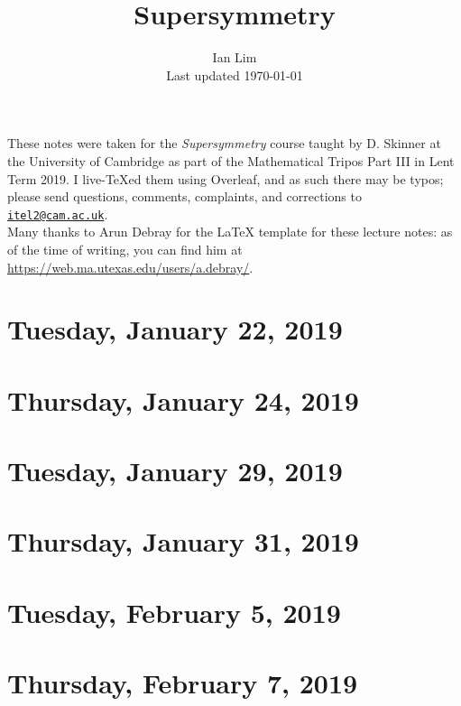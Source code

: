 \documentclass[reqno]{amsart}
\begin{document}
\title{Supersymmetry}
\author{Ian Lim\\ Last updated \today}
\maketitle
{\small\noindent These notes were taken for the \textit{Supersymmetry} course taught by D. Skinner at the University of Cambridge as part of the Mathematical Tripos Part III in Lent Term 2019. I live-\TeX ed them using Overleaf, and as such there may be typos; please send questions, comments, complaints, and corrections to 
\href{mailto:itel2@cam.ac.uk?subject=SUSY\%20Lecture\%20Notes}{\texttt{itel2@cam.ac.uk}}.\\
Many thanks to Arun Debray for the {\LaTeX} template for these lecture notes: as of the time of writing, you can find him at \url{https://web.ma.utexas.edu/users/a.debray/}.}

\tableofcontents

\section{Tuesday, January 22, 2019}
    

\section{Thursday, January 24, 2019}
    

\section{Tuesday, January 29, 2019}
    

\section{Thursday, January 31, 2019}
    

\section{Tuesday, February 5, 2019}
    

\section{Thursday, February 7, 2019}
    
\end{document}
